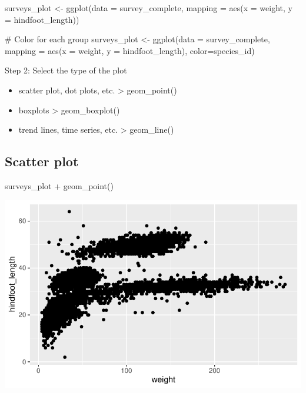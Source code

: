 \documentclass[
  letterpaper,
  DIV=11,
  numbers=noendperiod]{scrreprt}
\newenvironment{Shaded}{\begin{snugshade}}{\end{snugshade}}
\newcommand{\AttributeTok}[1]{\textcolor[rgb]{0.40,0.45,0.13}{#1}}
\newcommand{\CommentTok}[1]{\textcolor[rgb]{0.37,0.37,0.37}{#1}}
\newcommand{\FunctionTok}[1]{\textcolor[rgb]{0.28,0.35,0.67}{#1}}
\newcommand{\NormalTok}[1]{\textcolor[rgb]{0.00,0.23,0.31}{#1}}
\newcommand{\OtherTok}[1]{\textcolor[rgb]{0.00,0.23,0.31}{#1}}
\newcommand{\SpecialCharTok}[1]{\textcolor[rgb]{0.37,0.37,0.37}{#1}}
\providecommand{\tightlist}{%
  \setlength{\itemsep}{0pt}\setlength{\parskip}{0pt}}\usepackage{longtable,booktabs,array}
\begin{document}
\begin{Shaded}
\begin{Highlighting}[]
\NormalTok{surveys\_plot }\OtherTok{\textless{}{-}} \FunctionTok{ggplot}\NormalTok{(}\AttributeTok{data =}\NormalTok{ survey\_complete, }
    \AttributeTok{mapping =} \FunctionTok{aes}\NormalTok{(}\AttributeTok{x =}\NormalTok{ weight, }\AttributeTok{y =}\NormalTok{ hindfoot\_length))}

\CommentTok{\# Color for each group}
\NormalTok{surveys\_plot }\OtherTok{\textless{}{-}} \FunctionTok{ggplot}\NormalTok{(}\AttributeTok{data =}\NormalTok{ survey\_complete, }
    \AttributeTok{mapping =} \FunctionTok{aes}\NormalTok{(}\AttributeTok{x =}\NormalTok{ weight, }\AttributeTok{y =}\NormalTok{ hindfoot\_length),}
    \AttributeTok{color=}\NormalTok{species\_id)}
\end{Highlighting}
\end{Shaded}

Step 2: Select the type of the plot

\begin{itemize}
\tightlist
\item
  scatter plot, dot plots, etc. \textgreater{} geom\_point()
\item
  boxplots \textgreater{} geom\_boxplot()
\item
  trend lines, time series, etc. \textgreater{} geom\_line()
\end{itemize}

\subsection{Scatter plot}\label{scatter-plot}

\begin{Shaded}
\begin{Highlighting}[]
\NormalTok{surveys\_plot }\SpecialCharTok{+} \FunctionTok{geom\_point}\NormalTok{()}
\end{Highlighting}
\end{Shaded}

\includegraphics{src/notebooks/r_files/figure-pdf/unnamed-chunk-43-1.pdf}
\end{document}
